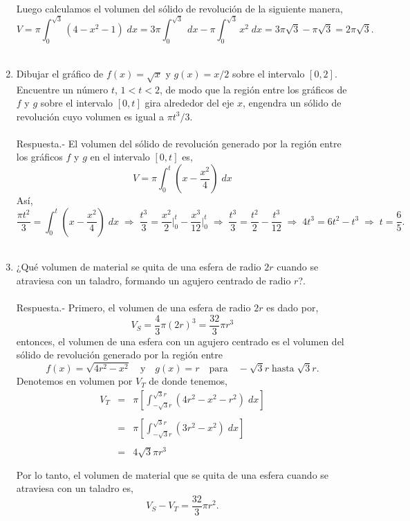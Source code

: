 \begin{enumerate}[ \bfseries 1.]
	Luego calculamos el volumen del sólido de revolución de la siguiente manera,
	$$V = \pi\int_0^{\sqrt{3}}(4-x^2-1)\; dx = 3\pi \int_0^{\sqrt{3}}\; dx - \pi\int_0^{\sqrt{3}} x^2\; dx = 3\pi \sqrt{3} - \pi\sqrt{3} = 2 \pi \sqrt{3} .$$\\

    \item Dibujar el gráfico de $f(x) = \sqrt{x}$ y $g(x)=x/2$ sobre el intervalo $[0,2]$. Encuentre un número $t$, $1<t<2$, de modo que la región entre los gráficos de $f$ y $g$ sobre el intervalo $[0,t]$ gira alrededor del eje $x$, engendra un sólido de revolución cuyo volumen es igual a $\pi t^3/3$.\\\\
	Respuesta.-\; El volumen del sólido de revolución generado por la región entre los gráficos $f$ y $g$ en el intervalo $[0,t]$ es,
	$$V=\pi\int_0^t \left(x-\dfrac{x^2}{4}\right)\; dx$$
	Así, 
	$$\dfrac{\pi t^2}{3} = \int_0^t \left(x-\dfrac{x^2}{4}\right)\; dx \;\Longrightarrow \; \dfrac{t^3}{3}=\dfrac{x^2}{2}\bigg|_0^t - \dfrac{x^3}{12}\bigg|_0^t \; \Longrightarrow \; \dfrac{t^3}{3} = \dfrac{t^2}{2} - \dfrac{t^3}{12} \; \Longrightarrow \; 4t^3 = 6t^2 - t^3 \; \Longrightarrow \; t=\dfrac{6}{5}.$$\\

    \item ¿Qué volumen de material se quita de una esfera de radio $2r$ cuando se atraviesa con un taladro, formando un agujero centrado de radio $r$?.\\\\
	Respuesta.-\; Primero, el volumen de una esfera de radio $2r$ es dado por,
	$$V_S = \dfrac{4}{3}\pi(2r)^3 = \dfrac{32}{3}\pi r^3$$
	entonces, el volumen de una esfera con un agujero centrado es el volumen del sólido de revolución generado por la región entre $$f(x) = \sqrt{4r^2 - x^2}\quad \mbox{y} \quad g(x)=r \quad \mbox{para}\quad -\sqrt{3}r \; \mbox{hasta} \; \sqrt{3}r.$$ 
	Denotemos en volumen por $V_T$ de donde tenemos,
	$$\begin{array}{rcl}
	    V_T&=&\pi \left[\int_{-\sqrt{3}r}^{\sqrt{3}r}(4r^2-x^2 - r^2)\; dx\right]\\\\
	       &=&\pi \left[\int_{-\sqrt{3}r}^{\sqrt{3}r} (3r^2 - x^2)\; dx\right]\\\\
	       &=&4\sqrt{3}\pi r^3\\\\
	\end{array}$$
	Por lo tanto, el volumen de material que se quita de una esfera cuando se atraviesa con un taladro es,
	$$V_S - V_T = \dfrac{32}{3}\pi r^2.$$\\


\end{enumerate}
